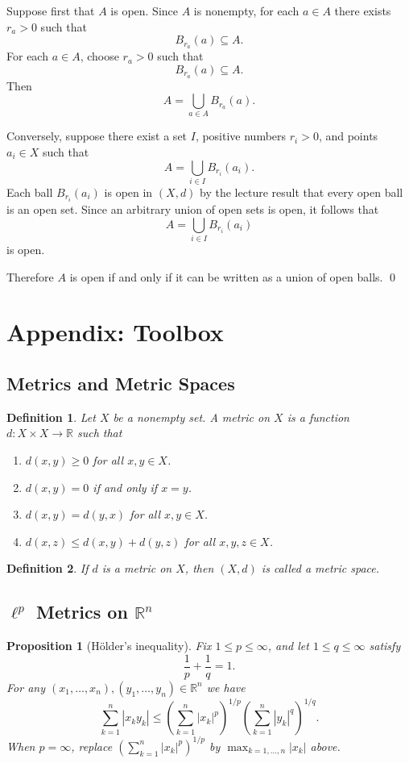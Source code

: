 \documentclass[12pt]{article}
\newtheorem{proposition}{Proposition}
\newtheorem{definition}{Definition}
\begin{document}
Suppose first that $A$ is open. Since $A$ is nonempty, for each $a\in A$ there exists $r_a>0$ such that
\[
B_{r_a}(a)\subseteq A.
\]
For each $a\in A$, choose $r_a>0$ such that
\[
B_{r_a}(a)\subseteq A.
\]
Then
\[
A=\bigcup_{a\in A} B_{r_a}(a).
\]

Conversely, suppose there exist a set $I$, positive numbers $r_i>0$, and points $a_i\in X$ such that
\[
A=\bigcup_{i\in I} B_{r_i}(a_i).
\]
Each ball $B_{r_i}(a_i)$ is open in $(X,d)$ by the lecture result that every open ball is an open set. Since an arbitrary union of open sets is open, it follows that
\[
A=\bigcup_{i\in I} B_{r_i}(a_i)
\]
is open.

Therefore $A$ is open if and only if it can be written as a union of open balls.
\qed

\newpage
\appendix
\section*{Appendix: Toolbox}

\subsection*{Metrics and Metric Spaces}
\begin{definition}
Let $X$ be a nonempty set. A metric on $X$ is a function
$d:X\times X\to\mathbb{R}$ such that
\begin{enumerate}[label=\textbf{(\arabic*)}]
  \item $d(x,y)\ge 0$ for all $x,y\in X$.
  \item $d(x,y)=0$ if and only if $x=y$.
  \item $d(x,y)=d(y,x)$ for all $x,y\in X$.
  \item $d(x,z)\le d(x,y)+d(y,z)$ for all $x,y,z\in X$.
\end{enumerate}
\end{definition}

\begin{definition}
If $d$ is a metric on $X$, then $(X,d)$ is called a metric space.
\end{definition}

\subsection*{$\ell^p$ Metrics on $\mathbb{R}^n$}
\begin{proposition}[H\"older's inequality]
Fix $1\le p\le\infty$, and let $1\le q\le\infty$ satisfy
\[
\frac{1}{p}+\frac{1}{q}=1.
\]
For any $(x_1,\dots,x_n),(y_1,\dots,y_n)\in\mathbb{R}^n$ we have
\[
\sum_{k=1}^n |x_k y_k|
\le
\left(\sum_{k=1}^n |x_k|^p\right)^{1/p}
\left(\sum_{k=1}^n |y_k|^q\right)^{1/q}.
\]
When $p=\infty$, replace $\left(\sum_{k=1}^n |x_k|^p\right)^{1/p}$ by
$\max_{k=1,\dots,n} |x_k|$ above.
\end{proposition}
\end{document}
